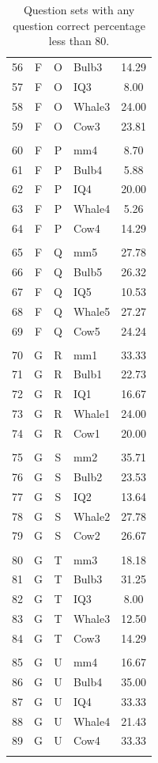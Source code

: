 \documentclass[12pt,nohyper]{tufte-handout}\usepackage[]{graphicx}\usepackage[]{color}
\begin{document}
\begin{longtable}{ccclc}
   56 & F & O & Bulb3 & 14.29 \\ 
   57 & F & O & IQ3 & 8.00 \\ 
   58 & F & O & Whale3 & 24.00 \\ 
   59 & F & O & Cow3 & 23.81 \\ 
   &  &  &  &  \\ 
   60 & F & P & mm4 & 8.70 \\ 
   61 & F & P & Bulb4 & 5.88 \\ 
   62 & F & P & IQ4 & 20.00 \\ 
   63 & F & P & Whale4 & 5.26 \\ 
   64 & F & P & Cow4 & 14.29 \\ 
   &  &  &  &  \\ 
   65 & F & Q & mm5 & 27.78 \\ 
   66 & F & Q & Bulb5 & 26.32 \\ 
   67 & F & Q & IQ5 & 10.53 \\ 
   68 & F & Q & Whale5 & 27.27 \\ 
   69 & F & Q & Cow5 & 24.24 \\ 
   &  &  &  &  \\ 
   70 & G & R & mm1 & 33.33 \\ 
   71 & G & R & Bulb1 & 22.73 \\ 
   72 & G & R & IQ1 & 16.67 \\ 
   73 & G & R & Whale1 & 24.00 \\ 
   74 & G & R & Cow1 & 20.00 \\ 
   &  &  &  &  \\ 
   75 & G & S & mm2 & 35.71 \\ 
   76 & G & S & Bulb2 & 23.53 \\ 
   77 & G & S & IQ2 & 13.64 \\ 
   78 & G & S & Whale2 & 27.78 \\ 
   79 & G & S & Cow2 & 26.67 \\ 
   &  &  &  &  \\ 
   80 & G & T & mm3 & 18.18 \\ 
   81 & G & T & Bulb3 & 31.25 \\ 
   82 & G & T & IQ3 & 8.00 \\ 
   83 & G & T & Whale3 & 12.50 \\ 
   84 & G & T & Cow3 & 14.29 \\ 
   &  &  &  &  \\ 
   85 & G & U & mm4 & 16.67 \\ 
   86 & G & U & Bulb4 & 35.00 \\ 
   87 & G & U & IQ4 & 33.33 \\ 
   88 & G & U & Whale4 & 21.43 \\ 
   89 & G & U & Cow4 & 33.33 \\ 
   \hline
\hline
\caption{Question sets with any question correct percentage less than 80.} 
\label{tab:summary_question}
\end{longtable}
\end{document}
